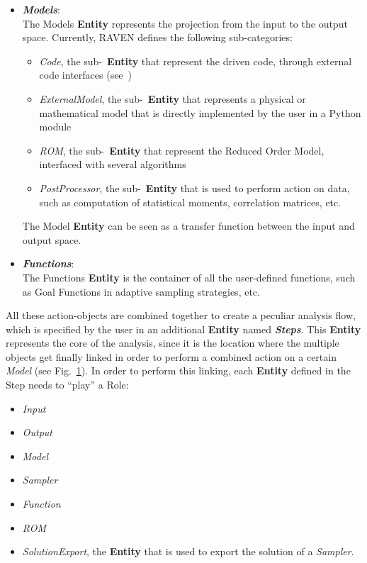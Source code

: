 \begin{itemize}
\begin{figure}[h!]
  \label{fig:ExampleStepEntity}
\end{figure}
  \item \textit{\textbf{Models}}:
  \\ The Models \textbf{Entity}  represents the projection from the input to the output space. Currently, RAVEN defines the 
  following sub-categories:
      \begin{itemize}
       \item \textit{Code}, the sub-~\textbf{Entity} that represent the driven code, through external code interfaces (see~\cite{RAVENuserManual})
       \item  \textit{ExternalModel}, the sub-~\textbf{Entity} that represents a physical or mathematical model that is 
       directly implemented by the user in a Python module
      \item \textit{ROM}, the sub-~\textbf{Entity} that represent the Reduced Order Model, interfaced with several algorithms
       \item \textit{PostProcessor}, the sub-~\textbf{Entity} that is used to perform action on data, such as computation of
       statistical moments, correlation matrices, etc.
      \end{itemize}
      The Model \textbf{Entity} can be seen as a transfer function between the input and output space.
  \item \textit{\textbf{Functions}}:
   \\ The Functions \textbf{Entity} is the container of all the user-defined functions, such as Goal Functions in adaptive 
   sampling strategies, etc.
\end{itemize}
All these action-objects are combined together to create a peculiar analysis flow, which is specified
by the user in an additional \textbf{Entity} named \textit{\textbf{Steps}}. This \textbf{Entity} represents the core of the analysis, since it is the location where the multiple objects get finally linked in order to perform a combined action on a certain \textit{Model} (see Fig.~\ref{fig:ExampleStepEntity}). In order to perform this linking, each \textbf{Entity} defined in the Step needs to ``play'' a Role:
\begin{itemize}
  \item \textit{Input}
  \item \textit{Output}
  \item \textit{Model}
  \item \textit{Sampler}
  \item \textit{Function}
  \item \textit{ROM}
  \item \textit{SolutionExport}, the \textbf{Entity} that is used to export the solution of a \textit{Sampler}.
\end{itemize}
